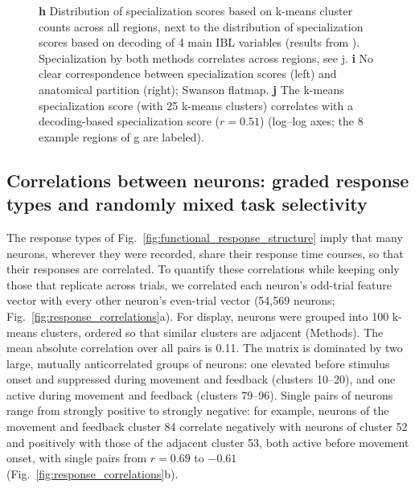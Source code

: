 \documentclass[10pt,lineno]{elife}
\begin{document}
\begin{figure}
{%
\textbf{h} Distribution of specialization scores based on k-means cluster counts across all regions, next to the distribution of specialization scores based on decoding of 4 main IBL variables (results from \cite{international2025brain}). Specialization by both methods correlates across regions, see j.
% 
\textbf{i} No clear correspondence between specialization scores (left) and anatomical partition (right); Swanson flatmap. 
% 
\textbf{j} The k-means specialization score (with 25 k-means clusters) correlates with a decoding-based specialization score ($r=0.51$) (log--log axes; the 8 example regions of g are labeled).
% 
}
\label{fig:anatomy_function}
\end{figure}

\FloatBarrier

\subsection{Correlations between neurons: graded response types and randomly mixed task selectivity}

The response types of Fig.~\ref{fig:functional_response_structure} imply that many neurons, wherever they were recorded, share their response time courses, so that their responses are correlated. To quantify these correlations while keeping only those that replicate across trials, we correlated each neuron's odd-trial feature vector with every other neuron's even-trial vector (54,569 neurons; Fig.~\ref{fig:response_correlations}a). For display, neurons were grouped into 100 k-means clusters, ordered so that similar clusters are adjacent (Methods). The mean absolute correlation over all pairs is 0.11. The matrix is dominated by two large, mutually anticorrelated groups of neurons: one elevated before stimulus onset and suppressed during movement and feedback (clusters 10--20), and one active during movement and feedback (clusters 79--96). Single pairs of neurons range from strongly positive to strongly negative: for example, neurons of the movement and feedback cluster 84 correlate negatively with neurons of cluster 52 and positively with those of the adjacent cluster 53, both active before movement onset, with single pairs from $r=0.69$ to $-0.61$ (Fig.~\ref{fig:response_correlations}b).
\end{document}
